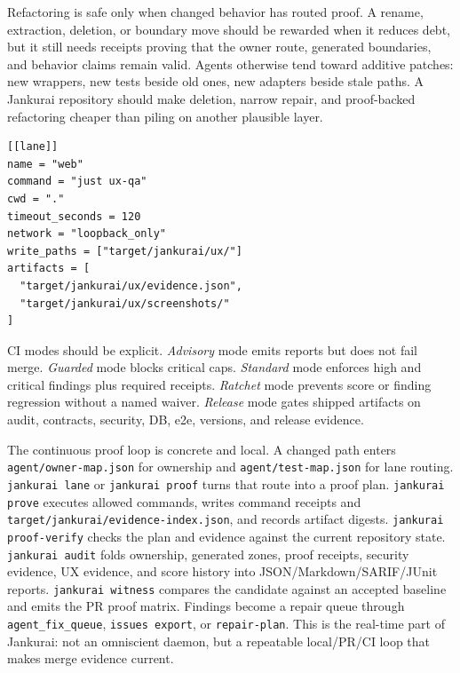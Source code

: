 Refactoring is safe only when changed behavior has routed proof. A rename, extraction, deletion, or boundary move should be rewarded when it reduces debt, but it still needs receipts proving that the owner route, generated boundaries, and behavior claims remain valid. Agents otherwise tend toward additive patches: new wrappers, new tests beside old ones, new adapters beside stale paths. A Jankurai repository should make deletion, narrow repair, and proof-backed refactoring cheaper than piling on another plausible layer.

\begin{lstlisting}[style=codebox]
[[lane]]
name = "web"
command = "just ux-qa"
cwd = "."
timeout_seconds = 120
network = "loopback_only"
write_paths = ["target/jankurai/ux/"]
artifacts = [
  "target/jankurai/ux/evidence.json",
  "target/jankurai/ux/screenshots/"
]
\end{lstlisting}

CI modes should be explicit. \emph{Advisory} mode emits reports but does not fail merge. \emph{Guarded} mode blocks critical caps. \emph{Standard} mode enforces high and critical findings plus required receipts. \emph{Ratchet} mode prevents score or finding regression without a named waiver. \emph{Release} mode gates shipped artifacts on audit, contracts, security, DB, e2e, versions, and release evidence.

The continuous proof loop is concrete and local. A changed path enters \texttt{agent/owner-map.json} for ownership and \texttt{agent/test-map.json} for lane routing. \texttt{jankurai lane} or \texttt{jankurai proof} turns that route into a proof plan. \texttt{jankurai prove} executes allowed commands, writes command receipts and \texttt{target/jankurai/evidence-index.json}, and records artifact digests. \texttt{jankurai proof-verify} checks the plan and evidence against the current repository state. \texttt{jankurai audit} folds ownership, generated zones, proof receipts, security evidence, UX evidence, and score history into JSON/Markdown/SARIF/JUnit reports. \texttt{jankurai witness} compares the candidate against an accepted baseline and emits the PR proof matrix. Findings become a repair queue through \texttt{agent\_fix\_queue}, \texttt{issues export}, or \texttt{repair-plan}. This is the real-time part of Jankurai: not an omniscient daemon, but a repeatable local/PR/CI loop that makes merge evidence current.

